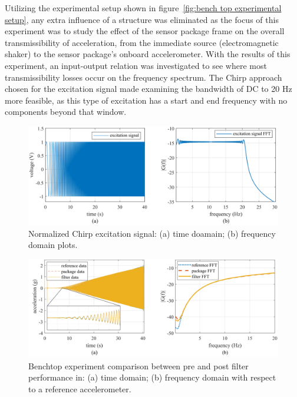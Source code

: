 \documentclass[]{spie}  %
\begin{document}
	
	Utilizing the experimental setup shown in figure~\ref{fig:bench top experimental setup}, any extra influence of a structure was eliminated as the focus of this experiment was to study the effect of the sensor package frame on the overall transmissibility of acceleration, from the immediate source (electromagnetic shaker) to the sensor package's onboard accelerometer. With the results of this experiment, an input-output relation was investigated to see where most transmissibility losses occur on the frequency spectrum. The Chirp approach chosen for the excitation signal made examining the bandwidth of DC to 20 Hz more feasible, as this type of excitation has a start and end frequency with no components beyond that window.
	
	\begin{figure} [H]
		\centering
		\includegraphics[width=6 in]{figures/excitation signal Time and Frequency domain chirp plot.png}
		\caption{Normalized Chirp excitation signal: (a) time doamain; (b) frequency domain plots.} 
		\label{fig:excitation signal Time and Frequency domain chirp plot} 
	\end{figure}

	\begin{figure} [H]
		\centering
		\includegraphics[width=6 in]{figures/Chirp Benchtop Filtered.png}
		\caption{Benchtop experiment comparison between pre and post filter performance in: (a) time domain; (b) frequency domain with respect to a reference accelerometer.} 
		\label{fig:excitation signal plot} 
	\end{figure}
	
\end{document}
